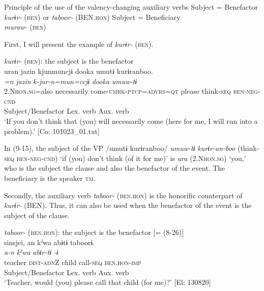 \ea   Principle of the use of the valency-changing auxiliary verbs \label{ex:9.14}
  \ea Subject = Benefactor\\
    \textit{kurɨr-} (\textsc{ben}) or \textit{taboor-} (BEN.\textsc{hon})
  \ex Subject = Beneficiary\\
    \textit{muraw-} (\textsc{ben})
    \z
\z

    
  First, I will present the example of \textit{kurɨr-} (\textsc{ben}).

\ea   \textit{kurɨr-} (\textsc{ben}): the subject is the benefactor\label{ex:9.15}\\
 \gllll  uran  jazin  kjunmuncjɨ  dooka  umutɨ  kurɨranboo.\\
    \textit{=n}  \textit{jazin}  \textit{k-jur-n=mun=ccjɨ}  \textit{dooka}  \textit{umuw-tɨ}  \textit{}\\
    2.N\textsc{hon}.\textsc{sg}=also  necessarily  come-\textsc{umrk}-\textsc{ptcp}=\textsc{advrs}=\textsc{qt}  please  think-\textsc{seq}  \textsc{ben}-\textsc{neg}-\textsc{cnd}\\
    {Subject/Benefactor}         {}        {}        {}                    {Lex. verb}  {Aux. verb}\\
    \glt     ‘If you don’t think that (you) will necessarily come (here for me, I will run into a problem).’ [Co: 101023\_01.txt]
\z

In (9-15), the subject of the VP /umutɨ kurɨranboo/ \textit{umuw-tɨ} \textit{kurɨr-an-boo} (think-\textsc{seq} \textsc{ben}-\textsc{neg}-\textsc{cnd}) ‘if (you) don’t think (of it for me)’ is \textit{ura} (2.N\textsc{hon}.\textsc{sg}) ‘you,’ who is the subject the clause and also the benefactor of the event. The beneficiary is the speaker \textsc{tm}.

  Secondly, the auxiliary verb \textit{taboor-} (\textsc{ben}.\textsc{hon}) is the honorific counterpart of \textit{kurɨr-} (BEN). Thus, it can also be used when the benefactor of the event is the subject of the clause.

\ea   \textit{taboor-} (\textsc{ben}.\textsc{hon}): the subject is the benefactor [= (8-26)]\label{ex:9.16}\\
 \gllll  {\textbar}sinsjei{\textbar},  an  kˀwa  abɨtɨ  taboorɨ.\\
    \textit{}  \textit{a-n}  \textit{kˀwa}  \textit{abɨr-tɨ}  \textit{-ɨ}\\
    teacher  \textsc{dist}-\textsc{adn}Z  child  call-\textsc{seq}  \textsc{ben}.\textsc{hon}-\textsc{imp}\\
    {Subject/Benefactor} {}   {}  {Lex. verb}  {Aux. verb}\\
    \glt     ‘Teacher, would (you) please call that child (for me)?’ [El: 130820]
\z

